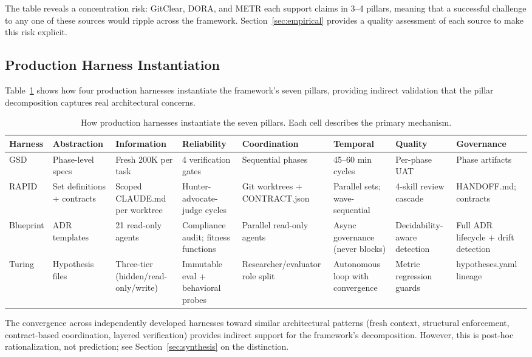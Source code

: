 \documentclass[11pt, a4paper, logo, copyright]{googledeepmind}
\begin{document}
The table reveals a concentration risk: GitClear, DORA, and METR each support claims in 3--4 pillars, meaning that a successful challenge to any one of these sources would ripple across the framework. Section~\ref{sec:empirical} provides a quality assessment of each source to make this risk explicit.

\subsection{Production Harness Instantiation}

Table~\ref{tab:harness-comparison} shows how four production harnesses instantiate the framework's seven pillars, providing indirect validation that the pillar decomposition captures real architectural concerns.

\begin{table}[ht]
\centering
\caption{How production harnesses instantiate the seven pillars. Each cell describes the primary mechanism.}
\label{tab:harness-comparison}
\scriptsize
\begin{tabular}{p{1.3cm}p{1.8cm}p{1.8cm}p{1.8cm}p{1.8cm}p{1.8cm}p{1.8cm}p{1.8cm}}
\toprule
\textbf{Harness} & \textbf{Abstraction} & \textbf{Information} & \textbf{Reliability} & \textbf{Coordination} & \textbf{Temporal} & \textbf{Quality} & \textbf{Governance} \\
\midrule
GSD & Phase-level specs & Fresh 200K per task & 4 verification gates & Sequential phases & 45--60 min cycles & Per-phase UAT & Phase artifacts \\
\addlinespace
RAPID & Set definitions + contracts & Scoped CLAUDE.md per worktree & Hunter-advocate-judge cycles & Git worktrees + CONTRACT.json & Parallel sets; wave-sequential & 4-skill review cascade & HANDOFF.md; contracts \\
\addlinespace
Blueprint & ADR templates & 21 read-only agents & Compliance audit; fitness functions & Parallel read-only agents & Async governance (never blocks) & Decidability-aware detection & Full ADR lifecycle + drift detection \\
\addlinespace
Turing & Hypothesis files & Three-tier (hidden/read-only/write) & Immutable eval + behavioral probes & Researcher/evaluator role split & Autonomous loop with convergence & Metric regression guards & hypotheses.yaml lineage \\
\bottomrule
\end{tabular}
\end{table}

The convergence across independently developed harnesses toward similar architectural patterns (fresh context, structural enforcement, contract-based coordination, layered verification) provides indirect support for the framework's decomposition. However, this is post-hoc rationalization, not prediction; see Section~\ref{sec:synthesis} on the distinction.
\end{document}
